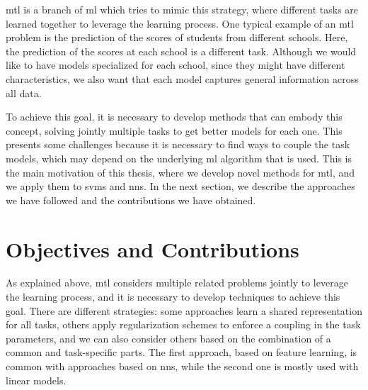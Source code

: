 \acrfull{mtl} is a branch of \acrshort{ml} which tries to mimic this strategy, where different tasks are learned together to leverage the learning process. 
One typical example of an \acrshort{mtl} problem is the prediction of the scores of students from different schools. Here, the prediction of the scores at each school is a different task. 
%
Although we would like to have models specialized for each school, since they might have different characteristics, we also want that each model captures general information across all data. 
%

To achieve this goal, it is necessary to develop methods that can embody this concept, solving jointly multiple tasks to get better models for each one. This presents some challenges because it is necessary to find ways to couple the task models, which may depend on the underlying \acrshort{ml} algorithm that is used. 
This is the main motivation of this thesis, where we develop novel methods for \acrshort{mtl}, and we apply them to \acrshort{svms} and \acrshort{nns}.
%
In the next section, we describe the approaches we have followed and the contributions we have obtained.
%
%








\section{Objectives and Contributions}
As explained above, \acrshort{mtl} considers multiple related problems jointly to leverage the learning process, and it is necessary to develop techniques to achieve this goal. There are different strategies: some approaches learn a shared representation for all tasks, others apply regularization schemes to enforce a coupling in the task parameters, and we can also consider others based on the combination of a common and task-specific parts. The first approach, based on feature learning, is common with approaches based on \acrshort{nns}, while the second one is mostly used with linear models. 

